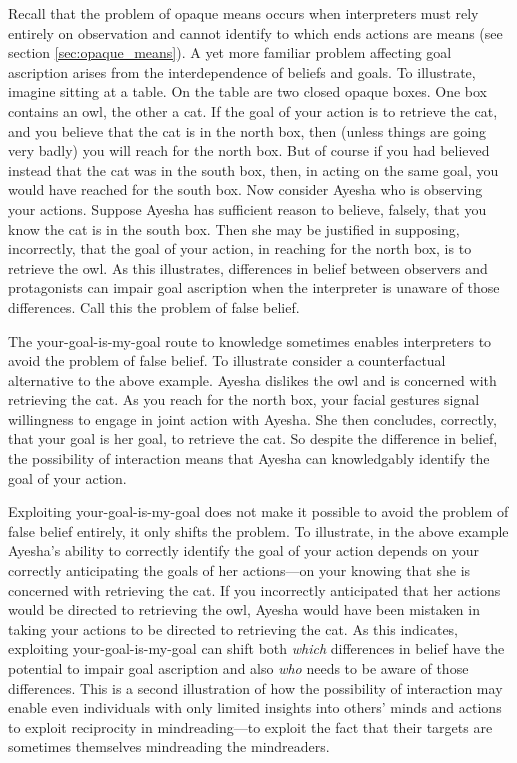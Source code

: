 \documentclass[14pt,a4paper]{extarticle}
\begin{document}
Recall that the problem of opaque means occurs when interpreters  must rely entirely on observation and cannot identify to which ends actions are means 
(see section \vref{sec:opaque_means}).
A yet more familiar problem affecting goal ascription 
arises from the interdependence of beliefs and goals.
To illustrate, 
imagine sitting at a table.
On the table are two closed opaque boxes.
One box contains an owl, the other a cat.
If the goal of your action is to retrieve the cat, 
and you believe that the cat is in the north box,
then 
(unless things are going very badly) 
you will reach for the north box.
But of course if you had believed instead that the cat was in the south box,
then, in acting on the same goal, you would have reached for the south box.
Now consider Ayesha who is observing your actions.
Suppose Ayesha has sufficient reason to believe, falsely, that you know the cat is in the south box.
Then she may be justified in supposing, incorrectly, that 
the goal of your action, in reaching for the north box,
is to retrieve the owl.
As this illustrates,
differences in belief between observers and protagonists can 
impair goal ascription
when the interpreter is unaware of those differences.
Call this the problem of false belief.

The your-goal-is-my-goal
route to knowledge
sometimes enables interpreters to avoid the problem of false belief.
To illustrate consider a counterfactual alternative to the above example.
Ayesha dislikes the owl and is concerned with retrieving the cat.
As you reach for the north box,
your facial gestures signal willingness to engage in joint action with Ayesha.
She then concludes, correctly, that your goal is her goal, to retrieve the cat.
So despite the difference in belief,
the possibility of interaction means that
Ayesha can knowledgably identify the goal of your action.

Exploiting your-goal-is-my-goal does not make it possible to  avoid the problem of false belief entirely,
it only shifts  the problem.
To illustrate,
in the above example Ayesha's ability to correctly identify the goal of your action
depends on your correctly anticipating the goals of her actions---on your knowing that she is concerned with retrieving the cat.
If you incorrectly anticipated that her actions would be directed to retrieving the owl,
Ayesha would have been mistaken in taking your actions to be directed to retrieving the cat.
As this indicates,
exploiting your-goal-is-my-goal 
can shift 
both 
\emph{which} differences in belief have the potential to impair  goal ascription
and also 
\emph{who} needs to be aware of those differences.
This is a second illustration of how the possibility of interaction 
may enable 
	even individuals with only limited insights into others' minds and actions
 	to exploit reciprocity in mindreading---to exploit the fact that their targets are sometimes themselves mindreading the mindreaders.
\end{document}
